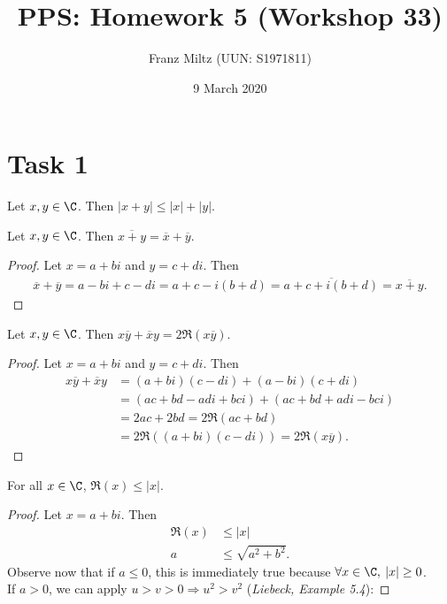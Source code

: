 \documentclass{article}
\title{PPS: Homework 5 (Workshop 33)}
\author{Franz Miltz (UUN: S1971811)}
\date{9 March 2020}
\begin{document}
\maketitle
\section*{Task 1}
\begin{claim}
	Let $x,y\in\C$. Then $|x+y|\leq |x|+|y|$.
\end{claim}
\begin{adjustwidth}{2em}{0pt}
	\begin{lemma}
		\label{l1}
		Let $x,y\in\C$. Then $\overline{x+y}=\overline{x}+\overline{y}$.
	\end{lemma}
	\begin{proof}
		Let $x=a+bi$ and $y=c+di$. Then
		\begin{align*}
			\overline{x}+\overline{y}=a-bi+c-di=a+c-i(b+d)=\overline{a+c+i(b+d)}=\overline{x+y}.
		\end{align*}
	\end{proof}
	\begin{lemma}
		\label{l2}
		Let $x,y\in\C$. Then $x\overline{y}+\overline{x}y=2\Re({x\overline{y}})$.
	\end{lemma}
	\begin{proof}
		Let $x=a+bi$ and $y=c+di$. Then
		\begin{align*}
			x\overline{y}+\overline{x}y & =(a+bi)(c-di)+(a-bi)(c+di)               \\
			                            & =(ac+bd-adi+bci)+(ac+bd+adi-bci)         \\
			                            & =2ac+2bd=2\Re(ac+bd)                     \\
			                            & =2\Re((a+bi)(c-di))=2\Re(x\overline{y}).
		\end{align*}
	\end{proof}
	\begin{lemma}
		\label{l3}
		For all $x\in\C$, $\Re(x)\leq|x|$.
	\end{lemma}
	\begin{proof}
		Let $x=a+bi$. Then
		\begin{align*}
			\Re(x) & \leq|x|              \\
			a      & \leq \sqrt{a^2+b^2}.
		\end{align*}
		Observe now that if $a\leq0$, this is immediately true because $\forall x\in\C,\:|x|\geq 0$.\\
		If $a>0$, we can apply $u>v>0\Rightarrow u^2>v^2$ (\emph{Liebeck, Example 5.4}):

\end{proof}
\end{adjustwidth}
\end{document}
